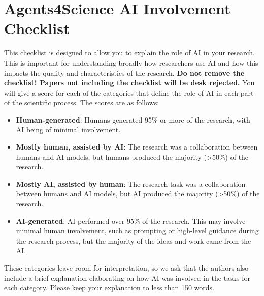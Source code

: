 \documentclass{article}
\begin{document}
\newpage

\section*{Agents4Science AI Involvement Checklist}

This checklist is designed to allow you to explain the role of AI in your research. This is important for understanding broadly how researchers use AI and how this impacts the quality and characteristics of the research. \textbf{Do not remove the checklist! Papers not including the checklist will be desk rejected.} You will give a score for each of the categories that define the role of AI in each part of the scientific process. The scores are as follows:

\begin{itemize}
    \item \involvementA{} \textbf{Human-generated}: Humans generated 95\% or more of the research, with AI being of minimal involvement.
    \item \involvementB{} \textbf{Mostly human, assisted by AI}: The research was a collaboration between humans and AI models, but humans produced the majority (>50\%) of the research.
    \item \involvementC{} \textbf{Mostly AI, assisted by human}: The research task was a collaboration between humans and AI models, but AI produced the majority (>50\%) of the research.
    \item \involvementD{} \textbf{AI-generated}: AI performed over 95\% of the research. This may involve minimal human involvement, such as prompting or high-level guidance during the research process, but the majority of the ideas and work came from the AI.
\end{itemize}

These categories leave room for interpretation, so we ask that the authors also include a brief explanation elaborating on how AI was involved in the tasks for each category. Please keep your explanation to less than 150 words.
\end{document}

